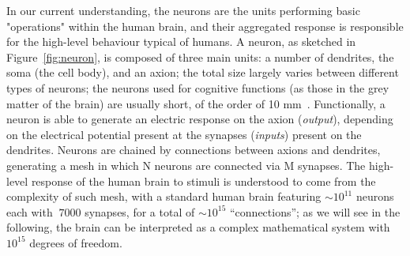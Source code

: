  In our current understanding, the neurons are the units performing basic "operations" within the human brain, and their aggregated response is responsible for the high-level behaviour typical of humans.
 A neuron, as sketched in Figure~\ref{fig:neuron}, is composed of three main units: a number of dendrites, the soma (the cell body), and an axion; the total size largely varies between different types of neurons; the neurons used for cognitive functions (as those in the grey matter of the brain) are usually short, of the order of 10 mm~\cite{neuronlength}.
Functionally, a neuron is able to generate an electric response on the axion (\emph{output}), depending on the electrical potential present at the synapses (\emph{inputs}) present on the dendrites. Neurons are chained by connections between axions and dendrites, generating a mesh in which N neurons are connected via M synapses.
 The high-level response of the human brain to stimuli is understood to come from the complexity of such mesh, with a standard human brain featuring $\sim 10^{11}$ neurons each with $~7000$ synapses, for a total of $\sim 10^{15}$ ``connections''; as we will see in the following, the brain can be interpreted as a complex mathematical system with $10^{15}$ degrees of freedom.

